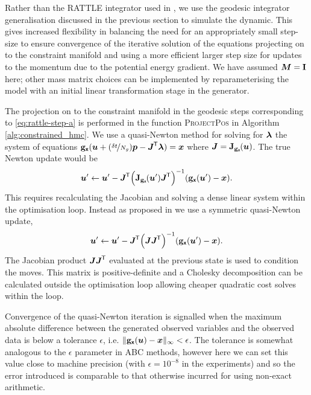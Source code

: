 Rather than the RATTLE integrator used in \citep{brubaker2012family}, we use the geodesic integrator generalisation discussed in the previous section to simulate the dynamic. This gives increased flexibility in balancing the need for an appropriately small step-size to ensure convergence of the iterative solution of the equations projecting on to the constraint manifold and using a more efficient larger step size for updates to the momentum due to the potential energy gradient. We have assumed $\boldsymbol{M} = \mathbf{I}$ here; other mass matrix choices can be implemented by reparameterising the model with an initial linear transformation stage in the generator.

The projection on to the constraint manifold in the geodesic steps corresponding to \eqref{eq:rattle-step-a} is performed in the function \textsc{ProjectPos} in Algorithm \ref{alg:constrained_hmc}. We use a quasi-Newton method for solving for $\boldsymbol{\lambda}$ the system of equations ${\mathbf{g}}_{\boldsymbol{\mathsf{x}}}(\boldsymbol{u} + (\nicefrac{\delta t}{N_g}) \boldsymbol{p} - \boldsymbol{J}^{\mkern-1.5mu\mathsf{T}}\boldsymbol{\lambda}) = \boldsymbol{x}$ where $\mtx{J} = \jacob{\genfunc_{\rvct{x}}}{\vct{u}}$. The true Newton update would be
\begin{equation}\label{eq:newton-iteration}
    \vct{u}'\gets \vct{u}' - 
    \mtx{J}\tr
    \lpa 
        \jacob{\genfunc_{\rvct{x}}}{\vct{u}'}\mtx{J}\tr
    \rpa^{-1}
    \lpa \genfunc_{\rvct{x}}(\vct{u}') - \vct{x} \rpa.
\end{equation}
This requires recalculating the Jacobian and solving a dense linear system within the optimisation loop. Instead as proposed in \citep{barth1995algorithms} we use a symmetric quasi-Newton update, 
\begin{equation}\label{eq:quasi-newton-iteration}
    \vct{u}'\gets \vct{u}' - 
    \mtx{J}\tr
    \lpa 
        \mtx{J}\mtx{J}\tr
    \rpa^{-1}
    \lpa \genfunc_{\rvct{x}}(\vct{u}') - \vct{x} \rpa.
\end{equation}
The Jacobian product $\boldsymbol{J}\boldsymbol{J}^{\mkern-1.5mu\mathsf{T}}$ evaluated at the previous state is used to condition the moves. This matrix is positive-definite and a Cholesky decomposition can be calculated outside the optimisation loop allowing cheaper quadratic cost solves within the loop. 

Convergence of the quasi-Newton iteration is signalled when the maximum absolute difference between the generated observed variables and the observed data is below a tolerance $\epsilon$, i.e. 
\(
  \Vert {\mathbf{g}}_{\boldsymbol{\mathsf{x}}}(\boldsymbol{u}) - \boldsymbol{x}\Vert_\infty < \epsilon 
\). The tolerance is somewhat analogous to the $\epsilon$ parameter in \ac{ABC} methods, however here we can set this value close to machine precision (with $\epsilon = 10^{-8}$ in the experiments) and so the error introduced is comparable to that otherwise incurred for using non-exact arithmetic.

